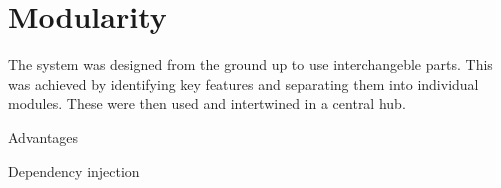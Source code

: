 
\section{Modularity}


The system was designed from the ground up to use interchangeble parts. This was achieved by identifying key features and separating them into individual modules. These were then used and intertwined in a central hub.

Advantages

Dependency injection
